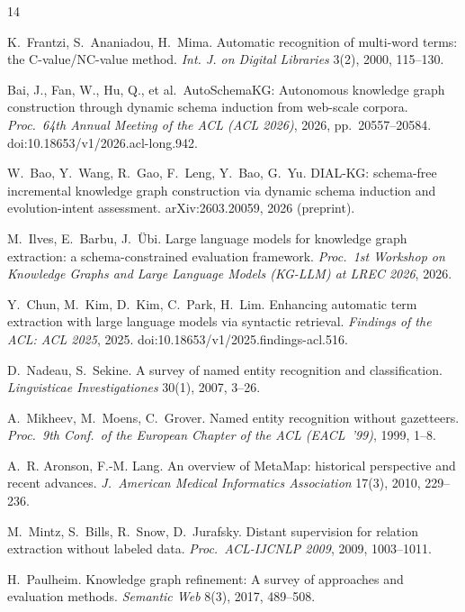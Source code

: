 \documentclass[sigconf,nonacm,anonymous]{acmart}
\begin{document}

\begin{thebibliography}{14}\footnotesize

 K.~Frantzi, S.~Ananiadou, H.~Mima. Automatic recognition
of multi-word terms: the C-value/NC-value method. \textit{Int. J. on
Digital Libraries} 3(2), 2000, 115--130.

 Bai, J., Fan, W., Hu, Q., et al.\ AutoSchemaKG:
Autonomous knowledge graph construction through dynamic schema
induction from web-scale corpora. \textit{Proc.\ 64th Annual Meeting
of the ACL (ACL 2026)}, 2026, pp.\ 20557--20584.
doi:10.18653/v1/2026.acl-long.942.

 W.~Bao, Y.~Wang, R.~Gao, F.~Leng, Y.~Bao, G.~Yu.
DIAL-KG: schema-free incremental knowledge graph construction via
dynamic schema induction and evolution-intent assessment.
arXiv:2603.20059, 2026 (preprint).

 M.~Ilves, E.~Barbu, J.~\"Ubi. Large language
models for knowledge graph extraction: a schema-constrained
evaluation framework. \textit{Proc.\ 1st Workshop on Knowledge
Graphs and Large Language Models (KG-LLM) at LREC 2026}, 2026.

 Y.~Chun, M.~Kim, D.~Kim, C.~Park, H.~Lim.
Enhancing automatic term extraction with large language models via
syntactic retrieval. \textit{Findings of the ACL: ACL 2025}, 2025.
doi:10.18653/v1/2025.findings-acl.516.

 D.~Nadeau, S.~Sekine. A survey of named entity
recognition and classification. \textit{Lingvisticae Investigationes}
30(1), 2007, 3--26.

 A.~Mikheev, M.~Moens, C.~Grover. Named entity
recognition without gazetteers. \textit{Proc.\ 9th Conf.\ of the
European Chapter of the ACL (EACL~'99)}, 1999, 1--8.

 A.~R. Aronson, F.-M. Lang. An overview of MetaMap:
historical perspective and recent advances. \textit{J.\ American
Medical Informatics Association} 17(3), 2010, 229--236.

 M.~Mintz, S.~Bills, R.~Snow, D.~Jurafsky. Distant
supervision for relation extraction without labeled data.
\textit{Proc.\ ACL-IJCNLP 2009}, 2009, 1003--1011.

 H.~Paulheim. Knowledge graph refinement: A survey of
approaches and evaluation methods. \textit{Semantic Web} 8(3), 2017,
489--508.


\end{thebibliography}
\end{document}
